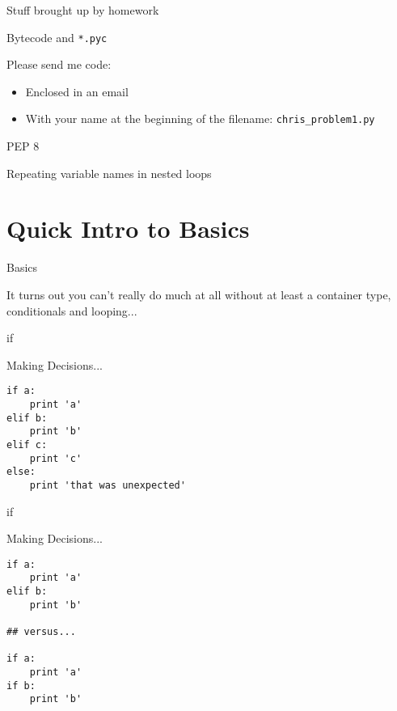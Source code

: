 \documentclass{beamer}
\begin{document}
\begin{frame}[fragile]{Stuff brought up by homework}

  \vfill
  {\Large Bytecode and \verb|*.pyc| }

  \vfill
  {\Large Please send me code:
    \begin{itemize}
      \item Enclosed in an email
      \item With your name at the beginning of the filename: \verb|chris_problem1.py|
    \end{itemize}
  }

  \vfill
  {\Large PEP 8}

  \vfill
  {\Large Repeating variable names in nested loops}


\end{frame}


\section{Quick Intro to Basics}

\begin{frame}[fragile]{Basics}

\vfill
{\LARGE It turns out you can't really do much at all without at least a container type, conditionals and looping...}
\vfill

\end{frame}

\begin{frame}[fragile]{if}

{\Large Making Decisions...}
\begin{verbatim}
if a:
    print 'a'
elif b:
    print 'b'
elif c:
    print 'c'
else:
    print 'that was unexpected'
\end{verbatim}

\end{frame}


\begin{frame}[fragile]{if}

{\Large Making Decisions...}
\begin{verbatim}
if a:
    print 'a'
elif b:
    print 'b'

## versus...

if a:
    print 'a'
if b:
    print 'b'
\end{verbatim}

\end{frame}
\end{document}
